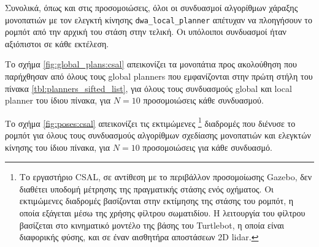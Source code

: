 Συνολικά, όπως και στις προσομοιώσεις, όλοι οι συνδυασμοί αλγορίθμων
χάραξης μονοπατιών με τον ελεγκτή κίνησης \texttt{dwa\_local\_planner}
απέτυχαν να πλοηγήσουν το ρομπότ από την αρχική του στάση στην τελική. Οι
υπόλοιποι συνδυασμοί ήταν αξιόπιστοι σε κάθε εκτέλεση.

Το σχήμα \ref{fig:global_plans:csal} απεικονίζει τα μονοπάτια προς
ακολούθηση που παρήχθησαν από όλους τους global planners που εμφανίζονται στην
πρώτη στήλη του πίνακα \ref{tbl:planners_sifted_list}, για όλους τους
συνδυασμούς global και local planner του ίδιου πίνακα, για $N=10$ προσομοιώσεις
κάθε συνδυασμού.

\begin{figure*}
\raggedright
  \begin{subfigure}[t]{\linewidth}
    \centering
    
  \end{subfigure}%
  \vspace{-1.5cm}
  \begin{subfigure}[t]{\linewidth}
    \centering
    
  \end{subfigure}%
  \vspace{-1.5cm}
  \begin{subfigure}[t]{\linewidth}
    \centering
    
  \end{subfigure}%
  \caption{\small Τα σχεδιασθέντα μονοπάτια προς ακολούθηση $\bm{\mathcal{G}}$
           που παρήχθησαν από τους τρεις αλγορίθμους χάραξης μονοπατιών για
           κάθε συνδυασμό τους με ελεγκτή κίνησης του πίνακα
           \ref{tbl:planners_sifted_list}, σε σχέση με τις ορισμένες αρχικές και
           τελικές στάσεις του περιβάλλοντος CSAL}
  \label{fig:global_plans:csal}
\end{figure*}

Το σχήμα \ref{fig:poses:csal} απεικονίζει τις εκτιμώμενες \footnote{Το
εργαστήριο CSAL, σε αντίθεση με το περιβάλλον προσομοίωσης Gazebo, δεν διαθέτει
υποδομή μέτρησης της πραγματικής στάσης ενός οχήματος. Oι εκτιμώμενες διαδρομές
βασίζονται στην εκτίμησης της στάσης του ρομπότ, η οποία εξάγεται μέσω της
χρήσης φίλτρου σωματιδίου. Η λειτουργία του φίλτρου βασίζεται στο κινηματικό
μοντέλο της βάσης του Turtlebot, η οποία είναι διαφορικής φύσης, και σε έναν
αισθητήρα αποστάσεων 2D lidar.} διαδρομές που διένυσε το ρομπότ για όλους τους
συνδυασμούς αλγορίθμων σχεδίασης μονοπατιών και ελεγκτών κίνησης του ίδιου
πίνακα, για $N=10$ προσομοιώσεις για κάθε συνδυασμό.

